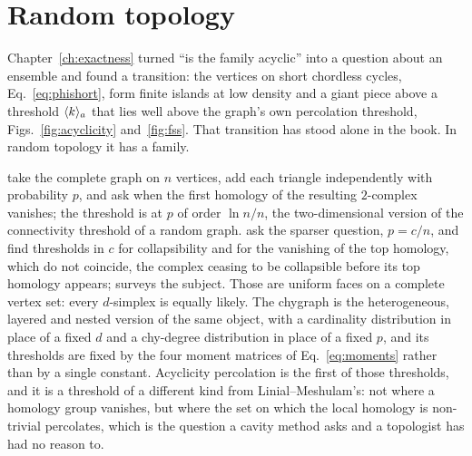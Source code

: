 \section{Random topology}
\label{sec:mb-random}

Chapter~\ref{ch:exactness} turned ``is the family acyclic'' into a question
about an ensemble and found a transition: the vertices on short chordless
cycles, Eq.~\eqref{eq:phishort}, form finite islands at low density and a
giant piece above a threshold $\langle k \rangle_{a}$ that lies well above the graph's
own percolation threshold, Figs.~\ref{fig:acyclicity} and~\ref{fig:fss}.
That transition has stood alone in the book. In random topology it has a
family.

\citet{linial2006} take the complete graph on $n$ vertices, add each
triangle independently with probability $p$, and ask when the first homology
of the resulting $2$-complex vanishes; the threshold is at $p$ of order
$\ln n/n$, the two-dimensional version of the connectivity threshold of a
random graph. \citet{aronshtam2013} ask the sparser question, $p=c/n$, and
find thresholds in $c$ for collapsibility and for the vanishing of the top
homology, which do not coincide, the complex ceasing to be collapsible
before its top homology appears; \citet{kahle2014} surveys the subject.
Those are uniform faces on a complete vertex set: every $d$-simplex is
equally likely. The chygraph is the heterogeneous, layered and nested version
of the same object, with a cardinality distribution in place of a fixed $d$
and a chy-degree distribution in place of a fixed $p$, and its thresholds are
fixed by the four moment matrices of Eq.~\eqref{eq:moments} rather than by a
single constant. Acyclicity percolation is the first of those thresholds,
and it is a threshold of a different kind from Linial--Meshulam's: not where
a homology group vanishes, but where the set on which the local homology is
non-trivial percolates, which is the question a cavity method asks and a
topologist has had no reason to.

